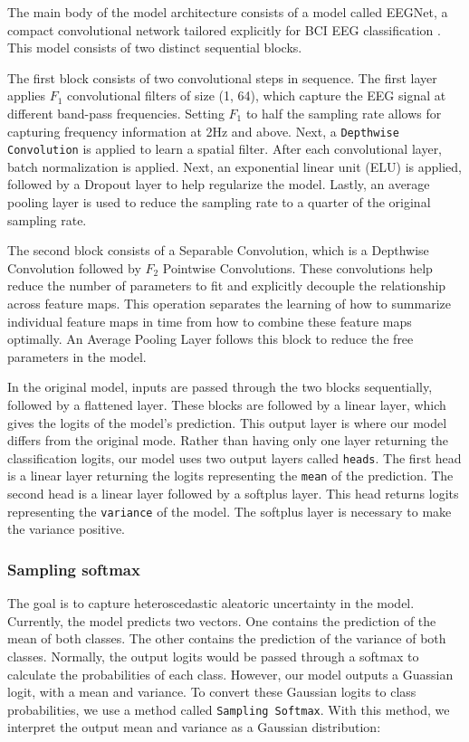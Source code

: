 The main body of the model architecture consists of a model called EEGNet, a compact convolutional network tailored explicitly for BCI EEG classification \citep{lawhern2018eegnet}. This model consists of two distinct sequential blocks. 

The first block consists of two convolutional steps in sequence. The first layer applies $F_1$ convolutional filters of size (1, 64), which capture the EEG signal at different band-pass frequencies. Setting $F_1$ to half the sampling rate allows for capturing frequency information at 2Hz and above. Next, a \verb|Depthwise Convolution| is applied to learn a spatial filter. After each convolutional layer, batch normalization is applied. Next, an exponential linear unit (ELU) is applied, followed by a Dropout layer to help regularize the model. Lastly, an average pooling layer is used to reduce the sampling rate to a quarter of the original sampling rate.

The second block consists of a Separable Convolution, which is a Depthwise Convolution followed by $F_2$ Pointwise Convolutions. These convolutions help reduce the number of parameters to fit and explicitly decouple the relationship across feature maps. This operation separates the learning of how to summarize individual feature maps in time from how to combine these feature maps optimally. An Average Pooling Layer follows this block to reduce the free parameters in the model.

In the original model, inputs are passed through the two blocks sequentially, followed by a flattened layer. These blocks are followed by a linear layer, which gives the logits of the model's prediction. This output layer is where our model differs from the original mode. Rather than having only one layer returning the classification logits, our model uses two output layers called \verb|heads|. The first head is a linear layer returning the logits representing the \verb|mean| of the prediction. The second head is a linear layer followed by a softplus layer. This head returns logits representing the \verb|variance| of the model. The softplus layer is necessary to make the variance positive.


\subsubsection{Sampling softmax}

The goal is to capture heteroscedastic aleatoric uncertainty in the model. Currently, the model predicts two vectors. One contains the prediction of the mean of both classes. The other contains the prediction of the variance of both classes. Normally, the output logits would be passed through a softmax to calculate the probabilities of each class. However, our model outputs a Guassian logit, with a mean and variance. To convert these Gaussian logits to class probabilities, we use a method called \verb|Sampling Softmax|. With this method, we interpret the output mean and variance as a Gaussian distribution:

